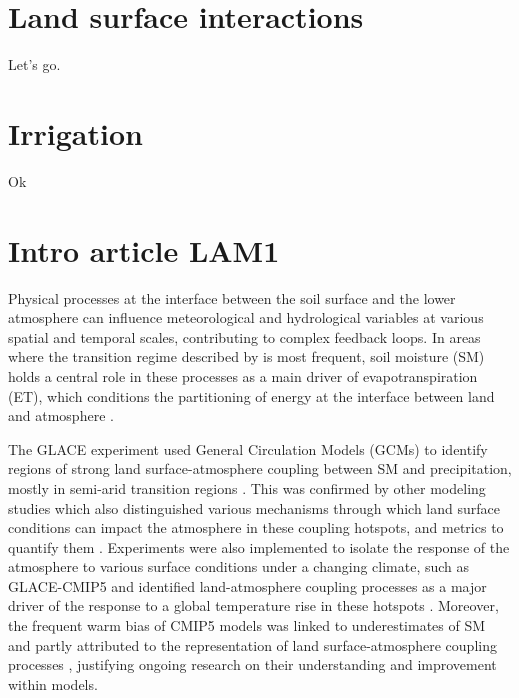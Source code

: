 \section{Land surface interactions}
Let's go.
\section{Irrigation}
Ok
\section{Intro article LAM1}
Physical processes at the interface between the soil surface and the lower atmosphere can influence meteorological 
and hydrological 
variables at various spatial and temporal scales, contributing to complex feedback loops.
In areas where the transition regime described by \citet{Budyko_1956, Budyko_1974} is most frequent, soil moisture (SM) holds a central role in these processes as a main driver of evapotranspiration (ET), which conditions the partitioning of energy at the interface between land and atmosphere \citep{betts_fife_1995, seneviratne_investigating_2010}. 
 
The GLACE experiment used General Circulation Models (GCMs) to identify regions of strong land surface-atmosphere coupling between SM and precipitation, mostly in semi-arid transition regions \citep{koster_regions_2004}. This was confirmed by other modeling studies which also distinguished various mechanisms through which land surface conditions can impact the atmosphere in these coupling hotspots, and metrics to quantify them \citep{dirmeyer_terrestrial_2011, zou_precipitation_2023}.
Experiments were also implemented to isolate the response of the atmosphere to various surface conditions under a changing climate, such as GLACE-CMIP5 \citep{seneviratne_impact_2013} and identified land-atmosphere coupling processes as a major driver of the response to a global temperature rise in these hotspots \citep{berg_interannual_2015}. 
Moreover, the frequent warm bias of CMIP5 models \citep{christensen_temperature_2012, mueller_systematic_2014} was linked to underestimates of SM \citep{al-yaari_satellite-based_2019} and partly attributed to the representation of land surface-atmosphere coupling processes \citep{cheruy_combined_2013, cheruy_role_2014}, justifying ongoing research on their understanding and improvement within models.

